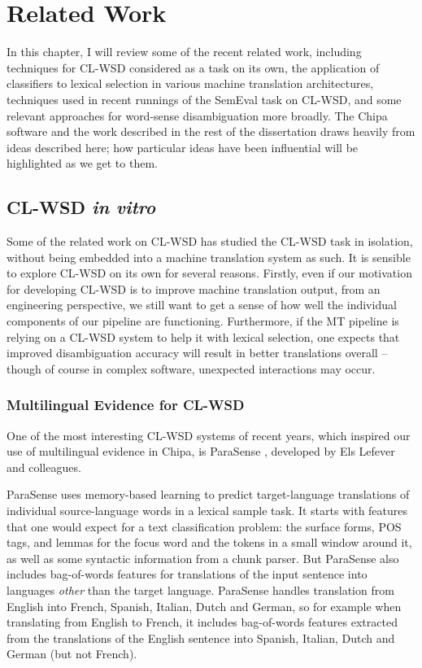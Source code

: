 \chapter{Related Work}
\label{chap:relatedwork}

In this chapter, I will review some of the recent related work, including
techniques for CL-WSD considered as a task on its own, the application of
classifiers to lexical selection in various machine translation architectures,
techniques used in recent runnings of the SemEval task on CL-WSD, and some
relevant approaches for word-sense disambiguation more broadly. The Chipa
software and the work described in the rest of the dissertation draws heavily
from ideas described here; how particular ideas have been influential will be
highlighted as we get to them.

\section{CL-WSD \emph{in vitro}}
Some of the related work on CL-WSD has studied the CL-WSD task in isolation, 
without being embedded into a machine translation system as such.
It is sensible to explore CL-WSD on its own for several reasons. Firstly, even
if our motivation for developing CL-WSD is to improve machine translation
output, from an engineering perspective, we still want to get a sense of
how well the individual components of our pipeline are functioning.
Furthermore, if the MT pipeline is relying on a CL-WSD system to help it with
lexical selection, one expects that improved disambiguation accuracy will
result in better translations overall -- though of course in complex software,
unexpected interactions may occur.

\subsection{Multilingual Evidence for CL-WSD}
One of the most interesting CL-WSD systems of recent years, which inspired our
use of multilingual evidence in Chipa, is ParaSense
\cite{lefever-hoste-decock:2011:ACL-HLT2011}, developed by Els Lefever and
colleagues.

ParaSense uses memory-based learning to predict target-language translations of
individual source-language words in a lexical sample task. It starts with
features that one would expect for a text classification problem: the surface
forms, POS tags, and lemmas for the focus word and the tokens in a small window
around it, as well as some syntactic information from a chunk parser. But
ParaSense also includes bag-of-words features for translations of the input
sentence into languages \emph{other} than the target language. ParaSense
handles translation from English into French, Spanish, Italian, Dutch and
German, so for example when translating from English to French, it includes
bag-of-words features extracted from the translations of the English sentence
into Spanish, Italian, Dutch and German (but not French).

